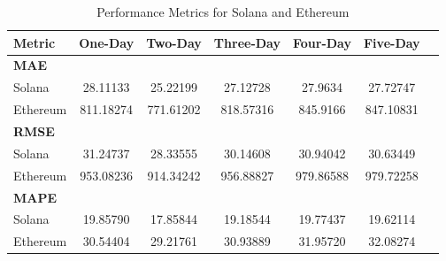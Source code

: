 \begin{table}[H]
\centering
\caption{Performance Metrics for Solana and Ethereum}
\begin{tabular}{lcccccc}
\toprule
\textbf{Metric} & \textbf{One-Day} & \textbf{Two-Day} & \textbf{Three-Day} & \textbf{Four-Day} & \textbf{Five-Day} \\
\midrule
\textbf{MAE} & & & & & \\
Solana        & 28.11133 & 25.22199 & 27.12728 & 27.9634 & 27.72747 \\
Ethereum      & 811.18274 & 771.61202 & 818.57316 & 845.9166 & 847.10831 \\
\midrule
\textbf{RMSE} & & & & & \\
Solana        & 31.24737 & 28.33555 & 30.14608 & 30.94042 & 30.63449 \\
Ethereum      & 953.08236 & 914.34242 & 956.88827 & 979.86588 & 979.72258 \\
\midrule
\textbf{MAPE} & & & & & \\
Solana        & 19.85790 & 17.85844 & 19.18544 & 19.77437 & 19.62114 \\
Ethereum      & 30.54404 & 29.21761 & 30.93889 & 31.95720 & 32.08274 \\
\bottomrule
\end{tabular}
\label{table:SOL_ETH_MAE_RMSE_MAPE}
\end{table}

